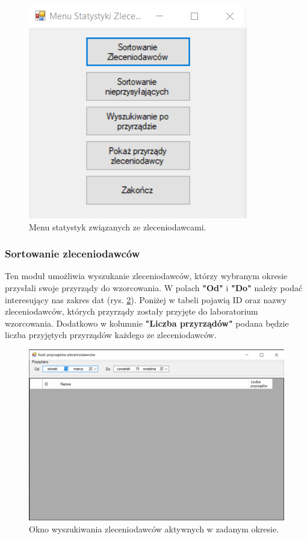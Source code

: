 \begin{figure}[htb]
	\centering
	\includegraphics{obrazki/Wyszukiwanie/Zleceniodawcy/menu_statystyki_zleceniodawcow.png}
	\caption{Menu statystyk związanych ze zleceniodawcami.}
	\label{menuStatystykiZleceniodawcy}
\end{figure}

\subsubsection{Sortowanie zleceniodawców}
\label{sort_zleceniodawcow}

Ten moduł umożliwia wyszukanie zleceniodawców, którzy wybranym okresie przysłali swoje przyrządy do wzorcowania. W polach \textbf{"Od"} i \textbf{"Do"} należy podać interesujący nas zakres dat (rys. \ref{aktywniZleceniodawcy}). Poniżej w tabeli pojawią ID oraz nazwy zleceniodawców, których przyrządy zostały przyjęte do laboratorium wzorcowania. Dodatkowo w kolumnie \textbf{"Liczba przyrządów"} podana będzie liczba przyjętych przyrządów każdego ze zleceniodawców.

\begin{figure}[htb]
	\centering
	\includegraphics{obrazki/Wyszukiwanie/Zleceniodawcy/ilosc_przyrzadow_zleceniodawcow.png}
	\caption{Okno wyszukiwania zleceniodawców aktywnych w zadanym okresie.}
	\label{aktywniZleceniodawcy}
\end{figure}

